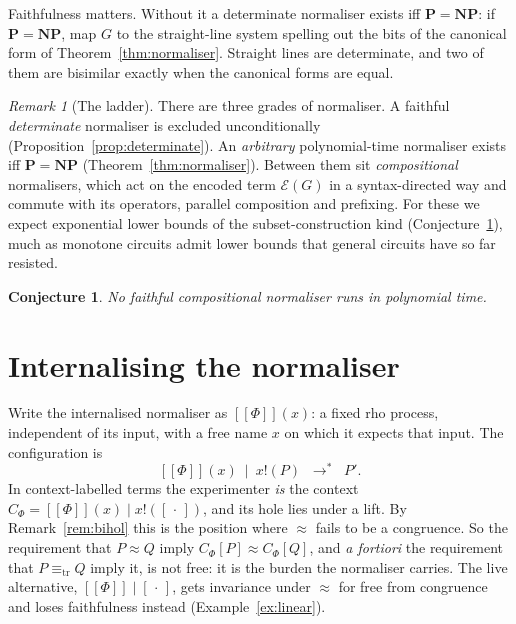 \documentclass[11pt]{article}
\theoremstyle{definition}
\theoremstyle{plain}
\newtheorem{conjecture}[definition]{Conjecture}
\theoremstyle{remark}
\newtheorem{remark}[definition]{Remark}
\newcommand{\out}[2]{#1!(#2)}
\newcommand{\enc}[1]{[\![#1]\!]}
\newcommand{\bisim}{\approx}
\newcommand{\treq}{\equiv_{\mathrm{tr}}}
\newcommand{\hole}{[\,\cdot\,]}
\newcommand{\Pclass}{\mathbf{P}}
\newcommand{\NPclass}{\mathbf{NP}}
\begin{document}
Faithfulness matters. Without it a determinate normaliser exists iff
$\Pclass = \NPclass$: if $\Pclass = \NPclass$, map $G$ to the straight-line
system spelling out the bits of the canonical form of
Theorem~\ref{thm:normaliser}. Straight lines are determinate, and two of
them are bisimilar exactly when the canonical forms are equal.

\begin{remark}[The ladder]\label{rem:ladder}
There are three grades of normaliser. A faithful \emph{determinate}
normaliser is excluded unconditionally (Proposition~\ref{prop:determinate}). An
\emph{arbitrary} polynomial-time normaliser exists iff $\Pclass =
\NPclass$ (Theorem~\ref{thm:normaliser}). Between them sit
\emph{compositional} normalisers, which act on the encoded term
$\mathcal{E}(G)$ in a syntax-directed way and commute with its operators,
parallel composition and prefixing. For
these we expect exponential lower bounds of the subset-construction kind
(Conjecture~\ref{conj:compositional}), much as monotone circuits admit
lower bounds that general circuits have so far resisted.
\end{remark}

\begin{conjecture}\label{conj:compositional}
No faithful compositional normaliser runs in polynomial time.
\end{conjecture}

\section{Internalising the normaliser}\label{sec:internal}

Write the internalised normaliser as $\enc{\Phi}(x)$: a fixed rho process,
independent of its input, with a free name $x$ on which it expects that
input. The configuration is
\[
\enc{\Phi}(x) \ \mid\ \out{x}{P} \;\;\to^*\;\; P'.
\]
In context-labelled terms the experimenter \emph{is} the context
$C_\Phi = \enc{\Phi}(x) \mid \out{x}{\hole}$, and its hole lies under a
lift. By Remark~\ref{rem:bihol} this is the position where
$\bisim$ fails to be a congruence. So the requirement that $P \bisim Q$
imply $C_\Phi[P] \bisim C_\Phi[Q]$, and \emph{a fortiori} the requirement
that $P \treq Q$ imply it, is not free: it is the burden the normaliser
carries. The live alternative, $\enc{\Phi} \mid \hole$, gets invariance
under $\bisim$ for free from congruence and loses faithfulness instead
(Example~\ref{ex:linear}).
\end{document}

